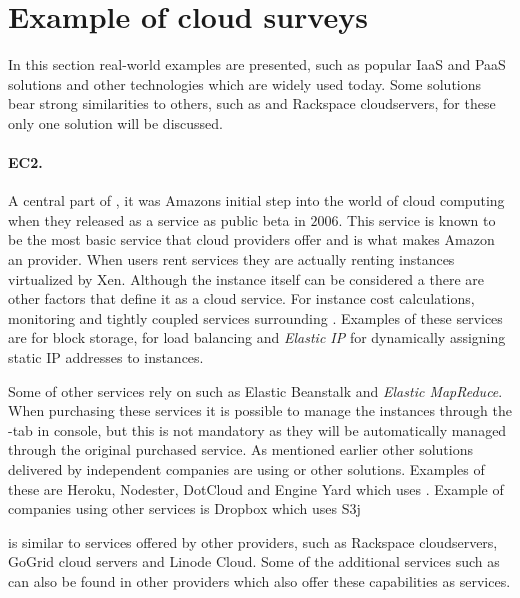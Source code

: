 \section{Example of cloud surveys}

In this section real-world examples are presented, such as popular IaaS and PaaS solutions
and other technologies which are widely used today.
Some solutions bear strong similarities to others, such as  and Rackspace cloudservers,
for these only one solution will be discussed.

\paragraph{EC2.}

A central part of , it was Amazons initial step into the world of cloud computing when
they released  as a service as public beta in $2006$.
This service is known to be the most basic service that cloud providers offer and is 
what makes Amazon an  provider.
When users rent  services they are actually renting  
instances virtualized by Xen.
Although the instance itself can be considered a  there are other factors 
that define it as a cloud service.
For instance cost calculations, monitoring and tightly coupled services surrounding .
Examples of these services are  for block storage, 
 for load balancing and \emph{Elastic IP} 
for dynamically assigning static IP addresses to instances.

Some of  other services rely on  such as  Elastic Beanstalk 
and \emph{Elastic MapReduce}.
When purchasing these services it is possible to manage the  instances 
through the -tab in  console, but this is not mandatory
as they will be automatically managed through the original purchased service.
As mentioned earlier other  solutions delivered by independent companies
are using  or other  solutions.
Examples of these are Heroku, Nodester, DotCloud and Engine Yard which uses .
Example of companies using other  services is Dropbox which uses S3j

 is similar to services offered by other providers, 
such as Rackspace cloudservers, GoGrid cloud servers
and Linode Cloud.
Some of the additional services such as  can also be found in other providers
which also offer these capabilities as services.

